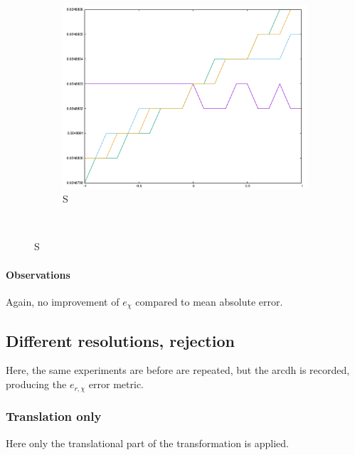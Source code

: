 {\begin{figure}[H]
\begin{subfigure}{.33\textwidth}
	\includegraphics[width=\linewidth]{fig/ajherr/t3r/S_mae.pdf}
	\caption{S}
\end{subfigure}\\
\end{figure}


\paragraph{Observations} Again, no improvement of $e_{\chi}$ compared to mean absolute error.


\newpage

\subsection{Different resolutions, rejection}
Here, the same experiments are before are repeated, but the \gls{arcdh} is recorded, producing the $e_{r,\chi}$ error metric.


\subsubsection{Translation only}
Here only the translational part of the transformation is applied.

}
